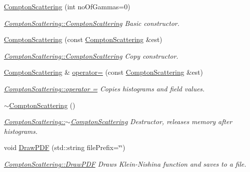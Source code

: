 \begin{DoxyCompactItemize}
\item 
\hyperlink{classComptonScattering_a3c50437f33ee40fcab617676ae36bb6b}{Compton\+Scattering} (int no\+Of\+Gammas=0)
\begin{DoxyCompactList}\small\item\em \hyperlink{classComptonScattering_a3c50437f33ee40fcab617676ae36bb6b}{Compton\+Scattering\+::\+Compton\+Scattering} Basic constructor. \end{DoxyCompactList}\item 
\hyperlink{classComptonScattering_a09713fba1b6ef5e3f8bd11253336e0b1}{Compton\+Scattering} (const \hyperlink{classComptonScattering}{Compton\+Scattering} \&est)
\begin{DoxyCompactList}\small\item\em \hyperlink{classComptonScattering_a3c50437f33ee40fcab617676ae36bb6b}{Compton\+Scattering\+::\+Compton\+Scattering} Copy constructor. \end{DoxyCompactList}\item 
\hyperlink{classComptonScattering}{Compton\+Scattering} \& \hyperlink{classComptonScattering_af450ec96e7bd187249b4d9693342e262}{operator=} (const \hyperlink{classComptonScattering}{Compton\+Scattering} \&est)
\begin{DoxyCompactList}\small\item\em \hyperlink{classComptonScattering_af450ec96e7bd187249b4d9693342e262}{Compton\+Scattering\+::operator =} Copies histograms and field values. \end{DoxyCompactList}\item 
\hyperlink{classComptonScattering_a949a87ad889d53ea2cb2e1597ccf9c55}{$\sim$\+Compton\+Scattering} ()
\begin{DoxyCompactList}\small\item\em \hyperlink{classComptonScattering_a949a87ad889d53ea2cb2e1597ccf9c55}{Compton\+Scattering\+::$\sim$\+Compton\+Scattering} Destructor, releases memory after histograms. \end{DoxyCompactList}\item 
void \hyperlink{classComptonScattering_a1da6f97e6702c6a49b6527b73d59d6c8}{Draw\+P\+DF} (std\+::string file\+Prefix=\char`\"{}\char`\"{})
\begin{DoxyCompactList}\small\item\em \hyperlink{classComptonScattering_a1da6f97e6702c6a49b6527b73d59d6c8}{Compton\+Scattering\+::\+Draw\+P\+DF} Draws Klein-\/\+Nishina function and saves to a file. \end{DoxyCompactList}\item 

\end{DoxyCompactItemize}
